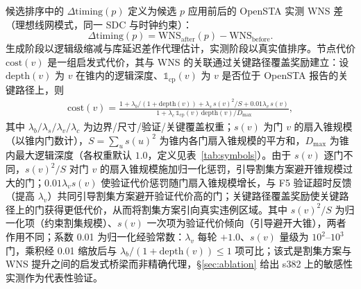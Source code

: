 \documentclass[journal]{IEEEtran}
\begin{document}
候选排序中的 $\Delta\mathrm{timing}(p)$ 定义为候选 $p$ 应用前后的 OpenSTA 实测 WNS 差（理想线网模式，同一 SDC 与时钟约束）：
\begin{equation}\label{eq:dtiming}
\Delta\mathrm{timing}(p) = \mathrm{WNS}_{\mathrm{after}}(p) - \mathrm{WNS}_{\mathrm{before}}.
\end{equation}
生成阶段以逻辑级缩减与库延迟差作代理估计，实测阶段以真实值排序。节点代价 $\mathrm{cost}(v)$ 是一组启发式代价，其与 WNS 的关联通过关键路径覆盖奖励建立：设 $\mathrm{depth}(v)$ 为 $v$ 在锥内的逻辑深度、$\mathbb{1}_{\mathrm{cp}}(v)$ 为 $v$ 是否位于 OpenSTA 报告的关键路径上，则
{\small
\begin{equation}
\label{eq:cost}
\begin{split}
\mathrm{cost}(v) = \frac{1 + \lambda_b/(1+\mathrm{depth}(v)) + \lambda_s\,s(v)^2/S + 0.01\lambda_v\,s(v)}{1 + \lambda_c\,\mathbb{1}_{\mathrm{cp}}(v)\,\mathrm{depth}(v)/D_{\max}},
\end{split}
\end{equation}
}
其中 $\lambda_b/\lambda_s/\lambda_v/\lambda_c$ 为边界/尺寸/验证/关键覆盖权重；$s(v)$ 为门 $v$ 的扇入锥规模（以锥内门数计），$S=\sum_u s(u)^2$ 为锥内各门扇入锥规模的平方和，$D_{\max}$ 为锥内最大逻辑深度（各权重默认 $1.0$，定义见表~\ref{tab:symbols}）。由于 $s(v)$ 逐门不同，$s(v)^2/S$ 对门 $v$ 的扇入锥规模施加归一化惩罚，引导割集方案避开锥规模过大的门；$0.01\lambda_v s(v)$ 使验证代价惩罚随门扇入锥规模增长，与 F5 验证超时反馈（提高 $\lambda_v$）共同引导割集方案避开验证代价高的门；关键路径覆盖奖励使关键路径上的门获得更低代价，从而将割集方案引向真实违例区域。其中 $s(v)^2/S$ 为归一化项（约束割集规模）、$s(v)$ 一次项为验证代价倾向（引导避开大锥），两者作用不同；系数 0.01 为归一化经验常数：$\lambda_v$ 每轮 $+1.0$、$s(v)$ 量级为 $10^2$--$10^3$ 门，乘积经 0.01 缩放后与 $\lambda_b/(1+\mathrm{depth}(v))\le 1$ 项可比；该式是割集方案与 WNS 提升之间的启发式桥梁而非精确代理，\S\ref{sec:ablation} 给出 s382 上的敏感性实测作为代表性验证。
\end{document}
